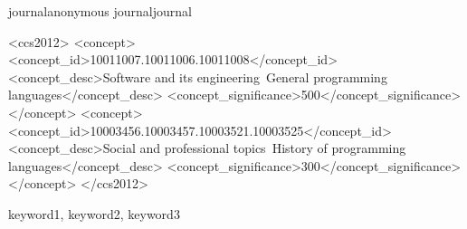 \documentclass[conference]{IEEEtran}
\def\acmversionanonymous{anonymous}
\def\acmversionjournal{journal}
\def\acmversion{none}
\def\acmversion{anonymous}
\def\acmversion{journal}
\begin{document}
\ifx\paperversion\paperversioncameraIEEE
\else
  \makeabstract
\fi

\ifx\acmversion\acmversionanonymous
{} %
\renewcommand\footnotetextcopyrightpermission[1]{} %
\fi
\ifx\acmversion\acmversionjournal
\begin{CCSXML}
<ccs2012>
<concept>
<concept_id>10011007.10011006.10011008</concept_id>
<concept_desc>Software and its engineering~General programming languages</concept_desc>
<concept_significance>500</concept_significance>
</concept>
<concept>
<concept_id>10003456.10003457.10003521.10003525</concept_id>
<concept_desc>Social and professional topics~History of programming languages</concept_desc>
<concept_significance>300</concept_significance>
</concept>
</ccs2012>
\end{CCSXML}


\fi

\maketitle
\ifx\grammarly\grammarlyon 
\onecolumn 
\else 
\fi

\ifx\paperversion\paperversioncameraIEEE
  \makeabstract
  \begin{IEEEkeywords}
    keyword1, keyword2, keyword3  %
  \end{IEEEkeywords}
\fi
\end{document}
